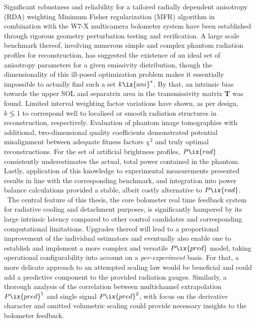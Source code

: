     Significant robustness and reliability for a tailored radially dependent anisotropy (RDA) weighting Minimum Fisher regularization (MFR) algorithm in combination with the W7-X multicamera bolometer system have been established through rigorous geometry perturbation testing and verification. A large scale benchmark thereof, involving numerous simple and complex phantom radiation profiles for reconstruction, has suggested the existence of an ideal set of anisotropy parameters for a given emissivity distribution, though the dimensionality of this ill-posed optimization problem makes it essentially impossible to actually find such a set $k\ix{ani}^{\ast}$. By that, an intrinsic bias towards the upper SOL and separatrix area in the transmissivity matrix $\mathbf{T}$ was found. Limited interval weighting factor variations have shown, as per design, $k\lessgtr1$ to correspond well to localised or smooth radiation structures in reconstruction, respectively. Evaluation of phantom image tomographies with additional, two-dimensional quality coefficients demonstrated potential misalignment between adequate fitness factors $\chi^{2}$ and truly optimal reconstructions. For the set of artificial brightness profiles, $P\ix{rad}$ consistently underestimates the actual, total power contained in the phantom. Lastly, application of this knowledge to experimental measurements presented results in line with the corresponding benchmark, and integration into power balance calculations provided a stable, albeit costly alternative to $P\ix{rad}$.\\%
%
    \,\newline%
    The central feature of this thesis, the core bolometer real time feedback system for radiative cooling and detachment purposes, is significantly hampered by its large intrinsic latency compared to other control candidates and corresponding computational limitations. Upgrades thereof will lead to a proportional improvement of the individual estimators and eventually also enable one to establish and implement a more complex and versatile $P\ix{pred}$ model, taking operational configurability into account on a \textit{per-experiment} basis. For that, a more delicate approach to an attempted scaling law would be beneficial and could add a predictive component to the provided radiation gauges. Similarly, a thorough analysis of the correlation between multichannel extrapolation $P\ix{pred}^{1}$ and single signal $P\ix{pred}^{2}$, with focus on the derivative character and omitted volumetric scaling could provide necessary insights to the bolometer feedback.\\%
